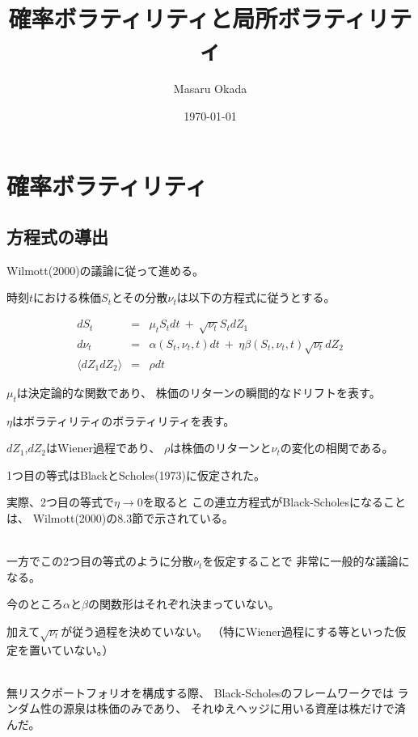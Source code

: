 \documentclass[uplatex,a4j,12pt,dvipdfmx]{jsarticle}
\title{
確率ボラティリティと局所ボラティリティ
}
\author{Masaru Okada}
\date{\today}
\begin{document}
\maketitle

\section{確率ボラティリティ}

\subsection{方程式の導出}

Wilmott(2000)の議論に従って進める。

時刻$t$における株価$S_{t}$とその分散$\nu_{t}$は以下の方程式に従うとする。


\begin{eqnarray*}
	dS_{t}
	&=&
	\mu_{t} S_{t} dt
	\ + \
	\sqrt{\nu_{t}} S_{t} dZ_{1}
	\\
	d \nu_{t}
	&=&
	\alpha(S_{t},\nu_{t},t) dt
	\ + \
	\eta \beta(S_{t},\nu_{t},t) \sqrt{\nu_{t}} dZ_{2}
	\\
	\langle
	dZ_{1} dZ_{2}
	\rangle
	&=&
	\rho dt
\end{eqnarray*}



$\mu_{t}$は決定論的な関数であり、
株価のリターンの瞬間的なドリフトを表す。

$\eta$はボラティリティのボラティリティを表す。

$dZ_{1}$,$dZ_{2}$はWiener過程であり、
$\rho$は株価のリターンと$\nu_{t}$の変化の相関である。

1つ目の等式はBlackとScholes(1973)に仮定された。

実際、2つ目の等式で$\eta \to 0$を取ると
この連立方程式がBlack-Scholesになることは、
Wilmott(2000)の8.3節で示されている。

\ \\

一方でこの2つ目の等式のように分散$\nu_{t}$を仮定することで
非常に一般的な議論になる。

今のところ$\alpha$と$\beta$の関数形はそれぞれ決まっていない。

加えて$\sqrt{\nu_{t}}$が従う過程を決めていない。
（特にWiener過程にする等といった仮定を置いていない。）

\ \\


無リスクポートフォリオを構成する際、
Black-Scholesのフレームワークでは
ランダム性の源泉は株価のみであり、
それゆえヘッジに用いる資産は株だけで済んだ。
\end{document}
